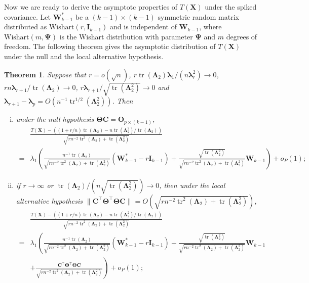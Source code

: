 \documentclass[12pt]{article} %
\DeclareMathOperator{\mytr}{tr}
\newcommand{\bX}{\mathbf{X}}
\newcommand{\bC}{\mathbf{C}}
\newcommand{\bO}{\mathbf{O}}
\newcommand{\bI}{\mathbf{I}}
\newcommand{\bW}{\mathbf{W}}
\newcommand{\bfsym}[1]{\ensuremath{\boldsymbol{#1}}}
\def\blambda {\bfsym {\lambda}}
\def\bLambda {\bfsym {\Lambda}}
\def\bTheta {\bfsym {\Theta}}
\def\bPsi {\bfsym {\Psi}}
\newtheorem{theorem}{Theorem}
\theoremstyle{definition}
\begin{document}
Now we are ready to derive the asymptotc properties of $T(\bX)$ under the spiked covariance.
Let $\bW^*_{k-1}$ be a $(k-1)\times (k-1)$ symmetric random matrix distributed as $\textrm{Wishart}(r,\bI_{k-1})$ and is independent of $\bW_{k-1}$, where $\textrm{Wishart}(m,\bPsi)$ is the Wishart distribution with parameter $\bPsi$ and $m$ degrees of freedom.
The following theorem gives the asymptotic distribution of $T(\bX)$ under the null and the local alternative hypothesis.
\begin{theorem}\label{thm1}
    Suppose that $r=o(\sqrt{n})$, $r\mytr(\bLambda_2)\blambda_1/(n\blambda_r^2)\to 0$, $rn\blambda_{r+1} /\mytr(\bLambda_2)\to 0$,
    $r\blambda_{r+1}/\sqrt{\mytr(\bLambda_2^2)}\to 0$ and $\blambda_{r+1}-\blambda_p=O(n^{-1}\mytr^{1/2}(\bLambda_2^2))$.
    Then
    \begin{enumerate}[(i)]
        \item 
            under the null hypothesis $\bTheta \bC=\bO_{p\times (k-1)}$,
\begin{equation*}
    \begin{split}
&
\frac{
    T(\bX)
    -
    \left((1+r/n)\mytr(\bLambda_2)-n\mytr(\bLambda_2^2)/\mytr(\bLambda_2)\right)
}{
    \sqrt{
        rn^{-2}\mytr^2(\bLambda_2)+ 
        \mytr(\bLambda_2^2)
    }
}
\\
=&
\lambda_1
\left(
\frac{
    n^{-1} \mytr(\bLambda_2)
}{
    \sqrt{
        rn^{-2} \mytr^2 (\bLambda_2) + \mytr(\bLambda_2^2)
    }
}
(\bW_{k-1}^* - r\bI_{k-1})
+
\frac{
    \sqrt{\mytr(\bLambda_2^2)}
}{
    \sqrt{
        rn^{-2} \mytr^2 (\bLambda_2) + \mytr(\bLambda_2^2)
    }
}
\bW_{k-1}
\right)
+o_P(1);
    \end{split}
\end{equation*}
        \item
            if $r\to \infty$ or $\mytr(\bLambda_2)/(n \sqrt{\mytr(\bLambda_2^2)})\to 0$, then under the local alternative hypothesis $\|\bC^\top \bTheta^\top \bTheta \bC\|=O(\sqrt{
        rn^{-2} \mytr^2 (\bLambda_2) + \mytr(\bLambda_2^2)
            })$,
\begin{equation*}
    \begin{split}
&
\frac{
    T(\bX)
    -
    \left((1+r/n)\mytr(\bLambda_2)-n\mytr(\bLambda_2^2)/\mytr(\bLambda_2)\right)
}{
    \sqrt{
        rn^{-2}\mytr^2(\bLambda_2)+ 
        \mytr(\bLambda_2^2)
    }
}
\\
=&
\lambda_1
\left(
\frac{
    n^{-1} \mytr(\bLambda_2)
}{
    \sqrt{
        rn^{-2} \mytr^2 (\bLambda_2) + \mytr(\bLambda_2^2)
    }
}
(\bW_{k-1}^* - r\bI_{k-1})
+
\frac{
    \sqrt{\mytr(\bLambda_2^2)}
}{
    \sqrt{
        rn^{-2} \mytr^2 (\bLambda_2) + \mytr(\bLambda_2^2)
    }
}
\bW_{k-1}
\right.
\\
&
+\left.
\frac{
    \bC^\top \bTheta^\top \bTheta \bC
}{
    \sqrt{
        rn^{-2} \mytr^2 (\bLambda_2) + \mytr(\bLambda_2^2)
    }
}
\right)
+o_P(1);
    \end{split}
\end{equation*}
    \end{enumerate}
    
\end{theorem}
\end{document}
